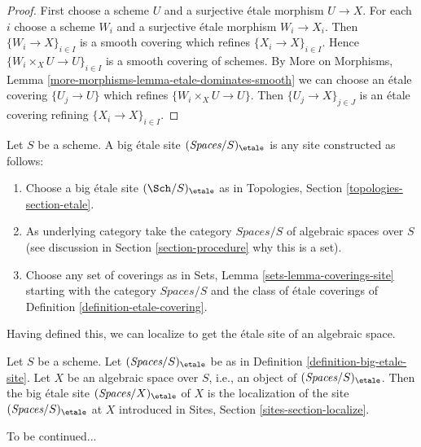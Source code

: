 \begin{proof}
First choose a scheme $U$ and a surjective \'etale morphism $U \to X$.
For each $i$ choose a scheme $W_i$ and a surjective \'etale morphism
$W_i \to X_i$. Then $\{W_i \to X\}_{i \in I}$ is a smooth covering
which refines $\{X_i \to X\}_{i \in I}$. Hence
$\{W_i \times_X U \to U\}_{i \in I}$ is a smooth covering of schemes.
By More on Morphisms, Lemma \ref{more-morphisms-lemma-etale-dominates-smooth}
we can choose an \'etale covering $\{U_j \to U\}$ which refines
$\{W_i \times_X U \to U\}$. Then $\{U_j \to X\}_{j \in J}$
is an \'etale covering refining $\{X_i \to X\}_{i \in I}$.
\end{proof}

\begin{definition}
\label{definition-big-etale-site}
Let $S$ be a scheme. A big \'etale site {\it $(\textit{Spaces}/S)_\etale$}
is any site constructed as follows:
\begin{enumerate}
\item Choose a big \'etale site $(\Sch/S)_\etale$ as in
Topologies, Section \ref{topologies-section-etale}.
\item As underlying category take the category $\textit{Spaces}/S$
of algebraic spaces over $S$ (see discussion in
Section \ref{section-procedure} why this is a set).
\item Choose any set of coverings as in
Sets, Lemma \ref{sets-lemma-coverings-site} starting with the
category $\textit{Spaces}/S$ and the class of \'etale coverings
of Definition \ref{definition-etale-covering}.
\end{enumerate}
\end{definition}

\noindent
Having defined this, we can localize to get the \'etale
site of an algebraic space.

\begin{definition}
\label{definition-big-small-etale}
Let $S$ be a scheme. Let $(\textit{Spaces}/S)_\etale$ be as in
Definition \ref{definition-big-etale-site}.
Let $X$ be an algebraic space over $S$, i.e., an object of
$(\textit{Spaces}/S)_\etale$. Then the big \'etale site
{\it $(\textit{Spaces}/X)_\etale$} of $X$
is the localization of the site $(\textit{Spaces}/S)_\etale$
at $X$ introduced in Sites, Section \ref{sites-section-localize}.
\end{definition}

\noindent
To be continued...








